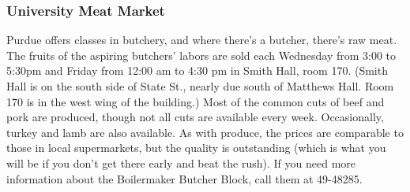 \subsubsection{University Meat Market}
Purdue offers classes in butchery, and where there's a butcher, there's raw meat. The fruits of the aspiring butchers' labors are sold each Wednesday from 3:00 to 5:30pm and Friday from 12:00 am to 4:30 pm in Smith Hall, room 170. (Smith Hall is on the south side of State St., nearly due south of Matthews Hall. Room 170 is in the west wing of the building.) Most of the common cuts of beef and pork are produced, though not all cuts are available every week. Occasionally, turkey and lamb are also available. As with produce, the prices are comparable to those in local supermarkets, but the quality is outstanding (which is what you will be if you don't get there early and beat the rush). If you need more information about the Boilermaker Butcher Block, call them at 49-48285.





